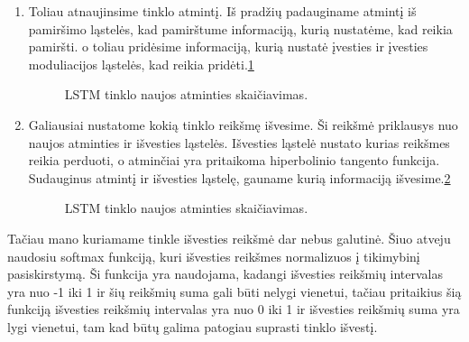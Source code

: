 \begin{enumerate}
\item Toliau atnaujinsime tinklo atmintį. Iš pradžių padauginame atmintį iš pamiršimo ląstelės, kad pamirštume informaciją, kurią nustatėme, kad reikia pamiršti. o toliau pridėsime informaciją, kurią nustatė įvesties ir įvesties moduliacijos ląstelės, kad reikia pridėti.\ref{fig:lstmnewc}
\begin{figure}[h!]
  \centering
{}
\caption{LSTM tinklo naujos atminties skaičiavimas.}
\label{fig:lstmnewc}
\end{figure}
\item Galiausiai nustatome kokią tinklo reikšmę išvesime. Ši reikšmė priklausys nuo naujos atminties ir išvesties ląstelės. Išvesties ląstelė nustato kurias reikšmes reikia perduoti, o atminčiai yra pritaikoma hiperbolinio tangento funkcija. Sudauginus atmintį ir išvesties ląstelę, gauname kurią informaciją išvesime.\ref{fig:lstmoutput}
\begin{figure}[h!]
  \centering
{}
\caption{LSTM tinklo naujos atminties skaičiavimas.}
\label{fig:lstmoutput}
\end{figure}
\end{enumerate}

Tačiau mano kuriamame tinkle išvesties reikšmė dar nebus galutinė. Šiuo atveju naudosiu softmax funkciją, kuri išvesties reikšmes normalizuos į tikimybinį pasiskirstymą. Ši funkcija yra naudojama, kadangi išvesties reikšmių intervalas yra nuo -1 iki 1 ir šių reikšmių suma gali būti nelygi vienetui, tačiau pritaikius šią funkciją išvesties reikšmių intervalas yra nuo 0 iki 1 ir išvesties reikšmių suma yra lygi vienetui, tam kad būtų galima patogiau suprasti tinklo išvestį.

